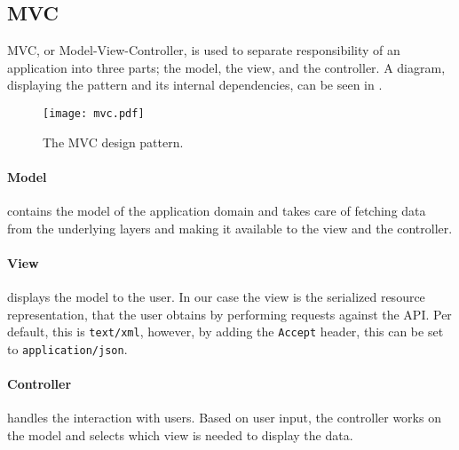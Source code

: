\subsection{MVC} 
MVC, or Model-View-Controller\cite{aspmvc}, is used to separate responsibility of an application into three parts; the model, the view, and the controller.
A diagram, displaying the pattern and its internal dependencies, can be seen in .

\begin{figure}[h]
\begin{center}
\texttt{[image: mvc.pdf]}
\caption{The MVC design pattern.}
\label{mvcdiagram}
\end{center}
\end{figure}

\paragraph{Model} contains the model of the application domain and takes care of fetching data from the underlying layers and making it available to the view and the controller.

\paragraph{View} displays the model to the user.
In our case the view is the serialized resource representation, that the user obtains by performing requests against the API.
Per default, this is \texttt{text/xml}, however, by adding the \texttt{Accept} header\cite[Section 14]{http_specification}, this can be set to \texttt{application/json}.

\paragraph{Controller} handles the interaction with users.
Based on user input, the controller works on the model and selects which view is needed to display the data.
